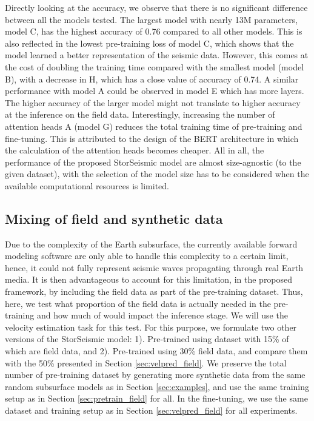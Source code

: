 \documentclass{article}
\begin{document}
Directly looking at the accuracy, we observe that there is no significant difference between all the models tested. The largest model with nearly 13M parameters, model C, has the highest accuracy of 0.76 compared to all other models. This is also reflected in the lowest pre-training loss of model C, which shows that the model learned a better representation of the seismic data. However, this comes at the cost of doubling the training time compared with the smallest model (model B), with a decrease in H, which has a close value of accuracy of 0.74. A similar performance with model A could be observed in model E which has more layers. The higher accuracy of the larger model might not translate to higher accuracy at the inference on the field data. Interestingly, increasing the number of attention heads A (model G) reduces the total training time of pre-training and fine-tuning. This is attributed to the design of the BERT architecture in which the calculation of the attention heads becomes cheaper. All in all, the performance of the proposed StorSeismic model are almost size-agnostic (to the given dataset), with the selection of the model size has to be considered when the available computational resources is limited.

\subsection{Mixing of field and synthetic data}
\label{sec:mixing}
Due to the complexity of the Earth subsurface, the currently available forward modeling software are only able to handle this complexity to a certain limit, hence, it could not fully represent seismic waves propagating through real Earth media. It is then advantageous to account for this limitation, in the proposed framework, by including the field data as part of the pre-training dataset. Thus, here, we test what proportion of the field data is actually needed in the pre-training and how much of would impact the inference stage. We will use the velocity estimation task for this test. For this purpose, we formulate two other versions of the StorSeismic model: 1). Pre-trained using dataset with 15\% of which are field data, and 2). Pre-trained using 30\% field data, and compare them with the 50\% presented in Section \ref{sec:velpred_field}. We preserve the total number of pre-training dataset by generating more synthetic data from the same random subsurface models as in Section \ref{sec:examples}, and use the same training setup as in Section \ref{sec:pretrain_field} for all. In the fine-tuning, we use the same dataset and training setup as in Section \ref{sec:velpred_field} for all experiments.
\end{document}
